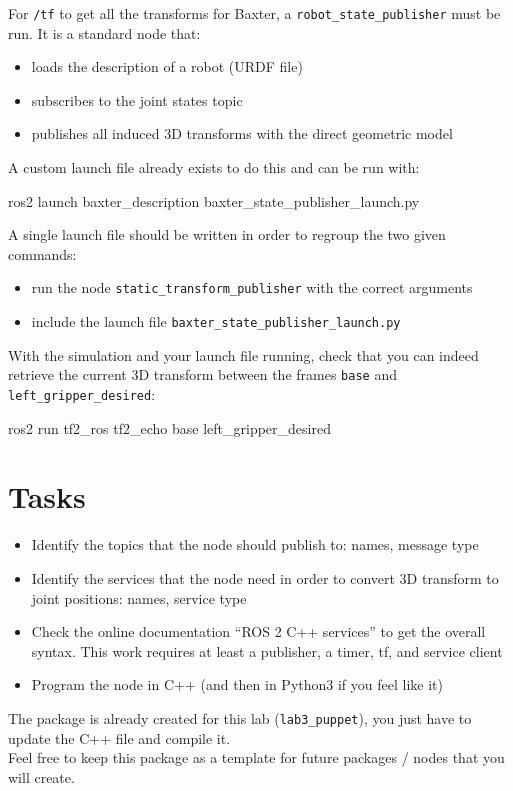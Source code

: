 \documentclass{ecnreport}
\begin{document}
For \texttt{/tf} to get all the transforms for Baxter, a \texttt{robot\_state\_publisher} must be run. It is a standard node that:
\begin{itemize}
 \item loads the description of a robot (URDF file)
 \item subscribes to the joint states topic
 \item publishes all induced 3D transforms with the direct geometric model
\end{itemize}
A custom launch file already exists to do this and can be run with:
\begin{bashcodelarge}
 ros2 launch baxter_description baxter_state_publisher_launch.py
\end{bashcodelarge}


A single launch file should be written in order to regroup the two given commands:
\begin{itemize}
 \item run the node \texttt{static\_transform\_publisher} with the correct arguments
 \item include the launch file \texttt{baxter\_state\_publisher\_launch.py}
 \end{itemize}
 
 With the simulation and your launch file running, check that you can indeed retrieve the current 3D transform between the frames \texttt{base} and \texttt{left\_gripper\_desired}:
 \begin{bashcodelarge}
 ros2 run tf2_ros tf2_echo base left_gripper_desired
\end{bashcodelarge}



\section{Tasks}

\begin{itemize}
\item Identify the topics that the node should publish to: names, message type
\item Identify the services that the node need in order to convert 3D transform to joint positions: names, service type
\item Check the online documentation ``ROS 2 C++ services'' to get the overall syntax. This work requires at least a publisher, a timer, tf, and service client
\item Program the node in C++ (and then in Python3 if you feel like it)
\end{itemize}

The package is already created for this lab (\texttt{lab3\_puppet}), you just have to update the C++ file and compile it.\\
Feel free to keep this package as a template for future packages / nodes that you will create.
\end{document}
